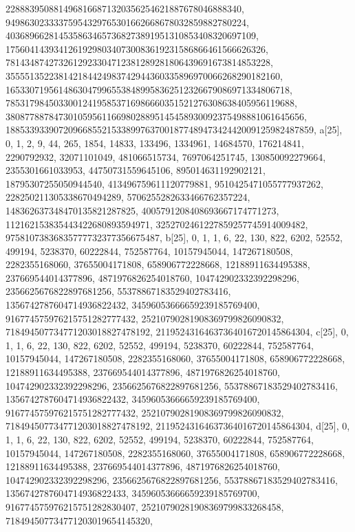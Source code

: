 {{{   2288839508814968166871320356254621887678046888340, 
   94986302333375954329765301662668678032859882780224, 
   4036896628145358634657368273891951310853408320697109, 
   175604143934126192980340730083619231586866461566626326, 
   7814348742732612923304712381289281806439691673814853228, 
   355551352238142184424983742944360335896970066268290182160, 
   16533071956148630479965538489958362512326679086971334806718, 
   785317984503300124195853716986660351521276308638405956119688, 
   38087788784730105956116698028895145458930092375498881061645656, 
   1885339339072096685521533899763700187748947342442009125982487859}}, 
 {a[25], {0, 1, 2, 9, 44, 265, 1854, 14833, 133496, 1334961, 14684570, 
   176214841, 2290792932, 32071101049, 481066515734, 7697064251745, 
   130850092279664, 2355301661033953, 44750731559645106, 895014631192902121, 
   18795307255050944540, 413496759611120779881, 9510425471055777937262, 
   228250211305338670494289, 5706255282633466762357224, 
   148362637348470135821287825, 4005791208408693667174771273, 
   112162153835443422680893594971, 3252702461227859257745914009482, 
   97581073836835777732377356675487}}, 
 {b[25], {0, 1, 1, 6, 22, 130, 822, 6202, 52552, 499194, 5238370, 60222844, 
   752587764, 10157945044, 147267180508, 2282355168060, 37655004171808, 
   658906772228668, 12188911634495388, 237669544014377896, 
   4871976826254018760, 104742902332392298296, 2356625676822897681256, 
   55378867183529402783416, 1356742787604714936822432, 
   34596053666659239185769400, 916774575976215751282777432, 
   25210790281908369799826090832, 718494507734771203018827478192, 
   21195243164637364016720145864304}}, 
 {c[25], {0, 1, 1, 6, 22, 130, 822, 6202, 52552, 499194, 5238370, 60222844, 
   752587764, 10157945044, 147267180508, 2282355168060, 37655004171808, 
   658906772228668, 12188911634495388, 237669544014377896, 
   4871976826254018760, 104742902332392298296, 2356625676822897681256, 
   55378867183529402783416, 1356742787604714936822432, 
   34596053666659239185769400, 916774575976215751282777432, 
   25210790281908369799826090832, 718494507734771203018827478192, 
   21195243164637364016720145864304}}, 
 {d[25], {0, 1, 1, 6, 22, 130, 822, 6202, 52552, 499194, 5238370, 60222844, 
   752587764, 10157945044, 147267180508, 2282355168060, 37655004171808, 
   658906772228668, 12188911634495388, 237669544014377896, 
   4871976826254018760, 104742902332392298296, 2356625676822897681256, 
   55378867183529402783416, 1356742787604714936822433, 
   34596053666659239185769700, 916774575976215751282830407, 
   25210790281908369799833268458, 718494507734771203019654145320, 
}}}
